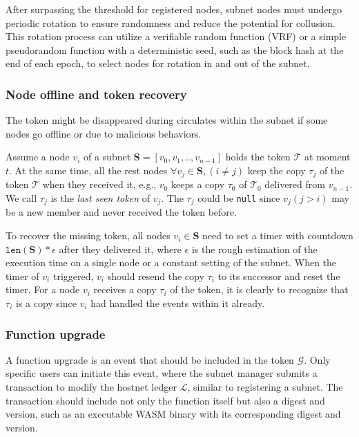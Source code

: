 \documentclass[11pt]{article}
\begin{document}
After surpassing the threshold for registered nodes, subnet nodes must undergo periodic rotation to ensure randomness and reduce the potential for collusion. This rotation process can utilize a verifiable random function (VRF) or a simple pseudorandom function with a deterministic seed, such as the block hash at the end of each epoch, to select nodes for rotation in and out of the subnet.



\subsubsection{Node offline and token recovery}
The token might be disappeared during circulates within the subnet if some nodes go offline or due to malicious behaviors.

Assume a node $v_{i}$ of a subnet $\mathbf{S} = [v_{0}, v_{1}, .., v_{n-1}]$ holds the token $\mathcal{T}$ at moment $t$.
At the same time, all the rest nodes $\forall v_{j} \in \mathbf{S}, (i \ne j)$ keep the copy $\tau_{j}$ of the token $\mathcal{T}$ when they received it, e.g., $v_{0}$ keeps a copy $\tau_{0}$ of $\mathcal{T}_{0}$ delivered from $v_{n-1}$.
We call $\tau_{j}$ is the \textit{last seen token} of $v_{j}$.
The $\tau_{j}$ could be \texttt{null} since $v_{j}(j > i)$ may be a new member and never received the token before.

To recover the missing token, all nodes $v_{i} \in \mathbf{S}$ need to set a timer with countdown $\texttt{len}(\mathbf{S}) * \epsilon$ after they delivered it, where $\epsilon$ is the rough estimation of the execution time on a single node or a constant setting of the subnet.
When the timer of $v_{i}$ triggered, $v_{i}$ should resend the copy $\tau_{i}$ to its successor and reset the timer.
For a node $v_{i}$ receives a copy $\tau_{i}$ of the token, it is clearly to recognize that $\tau_{i}$ is a copy since $v_{i}$ had handled the events within it already.

\subsubsection{Function upgrade}
A function upgrade is an event that should be included in the token $\mathcal{G}$. Only specific users can initiate this event, where the subnet manager submits a transaction to modify the hostnet ledger $\mathcal{L}$, similar to registering a subnet. The transaction should include not only the function itself but also a digest and version, such as an executable WASM binary with its corresponding digest and version.
\end{document}
